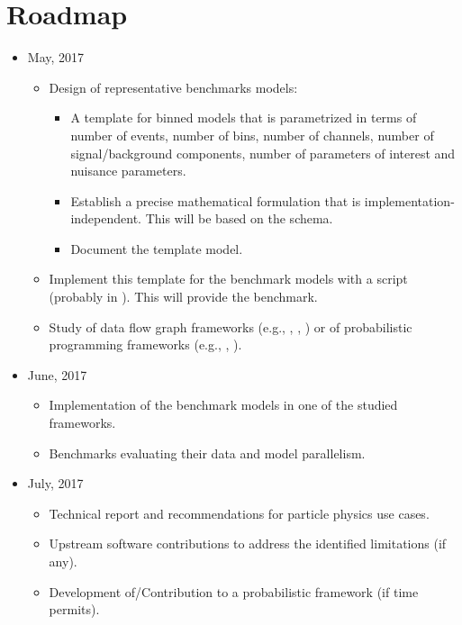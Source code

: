 \section{Roadmap}

\begin{itemize}
	\item May, 2017
	      \begin{itemize}
	      	\item Design of representative benchmarks models:
	      	      \begin{itemize}
	      	      	\item A template for binned models that is parametrized in terms of number of events, number of bins, number of channels, number of signal/background components, number of parameters of interest and nuisance parameters.
	      	      	\item Establish a precise mathematical formulation that is implementation-independent.
	      	      	      This will be based on the  schema.
	      	      	\item Document the template model.
	      	      \end{itemize}
	      	\item Implement this template for the benchmark models with a  script (probably in ).
	      	      This will provide the  benchmark.
	      	\item Study of data flow graph frameworks (e.g., , , ) or of probabilistic programming frameworks (e.g., , ).
	      \end{itemize}
	\item June, 2017
	      \begin{itemize}
	      	\item Implementation of the benchmark models in one of the studied frameworks.
	      	\item Benchmarks evaluating their data and model parallelism.
	      \end{itemize}
	\item July, 2017
	      \begin{itemize}
	      	\item Technical report and recommendations for particle physics use cases.
	      	\item Upstream software contributions to address the identified limitations (if any).
	      	\item Development of/Contribution to a probabilistic framework (if time permits).
	      \end{itemize}
\end{itemize}
